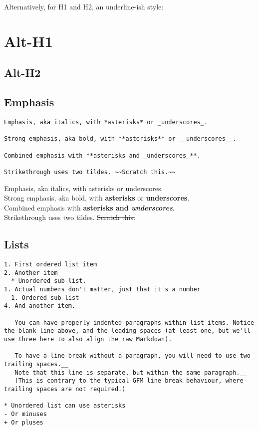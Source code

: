 \documentclass[a4paper, 11pt]{gfm}
\begin{document}
Alternatively, for H1 and H2, an underline-ish style:

\section{Alt-H1}

\subsection{Alt-H2}


\subsection{Emphasis}

\begin{lstlisting}
Emphasis, aka italics, with *asterisks* or _underscores_.

Strong emphasis, aka bold, with **asterisks** or __underscores__.

Combined emphasis with **asterisks and _underscores_**.

Strikethrough uses two tildes. ~~Scratch this.~~
\end{lstlisting}

Emphasis, aka italics, with asterisks or underscores. \\

Strong emphasis, aka bold, with \textbf{asterisks} or \textbf{underscores}. \\

Combined emphasis with \textbf{asterisks and \textit{underscores}}. \\

Strikethrough uses two tildes. \sout{Scratch this.}


\subsection{Lists}

\begin{lstlisting}
1. First ordered list item
2. Another item
  * Unordered sub-list.
1. Actual numbers don't matter, just that it's a number
  1. Ordered sub-list
4. And another item.

   You can have properly indented paragraphs within list items. Notice the blank line above, and the leading spaces (at least one, but we'll use three here to also align the raw Markdown).

   To have a line break without a paragraph, you will need to use two trailing spaces.__
   Note that this line is separate, but within the same paragraph.__
   (This is contrary to the typical GFM line break behaviour, where trailing spaces are not required.)

* Unordered list can use asterisks
- Or minuses
+ Or pluses
\end{lstlisting}
\end{document}
